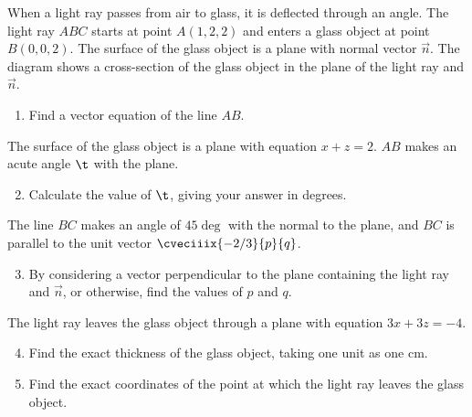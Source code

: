 \begin{problem}
    When a light ray passes from air to glass, it is deflected through an angle. The light ray $ABC$ starts at point $A(1, 2, 2)$ and enters a glass object at point $B(0, 0, 2)$. The surface of the glass object is a plane with normal vector $\vec n$. The diagram shows a cross-section of the glass object in the plane of the light ray and $\vec n$.

    \begin{center}
    \end{center}

    \begin{enumerate}
        \item Find a vector equation of the line $AB$.
    \end{enumerate}

    The surface of the glass object is a plane with equation $x + z = 2$. $AB$ makes an acute angle $\t$ with the plane.

    \begin{enumerate}
        \setcounter{enumi}{1}
        \item Calculate the value of $\t$, giving your answer in degrees.
    \end{enumerate}

    The line $BC$ makes an angle of $45 \deg$ with the normal to the plane, and $BC$ is parallel to the unit vector $\cveciiix{-2/3}{p}{q}$.

    \begin{enumerate}
        \setcounter{enumi}{2}
        \item By considering a vector perpendicular to the plane containing the light ray and $\vec n$, or otherwise, find the values of $p$ and $q$.
    \end{enumerate}

    The light ray leaves the glass object through a plane with equation $3x + 3z = -4$.
    \begin{enumerate}
        \setcounter{enumi}{3}
        \item Find the exact thickness of the glass object, taking one unit as one cm.
        \item Find the exact coordinates of the point at which the light ray leaves the glass object.
    \end{enumerate}
\end{problem}
